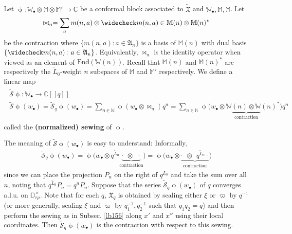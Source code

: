 \documentclass[12pt,a4paper,notitlepage]{article}
\theoremstyle{definition}
\theoremstyle{plain}
\newcommand{\fk}{\mathfrak}
\newcommand{\mc}{\mathcal}
\newcommand{\wtd}{\widetilde}
\newcommand{\wch}{\widecheck}
\newcommand{\End}{\mathrm{End}} %
\newcommand{\blt}{\bullet}
\newcommand{\Wbb}{\mathbb W}
\newcommand{\Mbb}{\mathbb M}
\newcommand{\Cbb}{\mathbb C}
\newcommand{\Nbb}{\mathbb N}
\newcommand{\Dbb}{\mathbb D}
\numberwithin{equation}{section}
\begin{document}
\subsection{}


Let $\upphi:\Wbb_\blt\otimes\Mbb\otimes\Mbb'\rightarrow\Cbb$ be a conformal block associated to $\wtd{\fk X}$ and $\Wbb_\blt,\Mbb,\Mbb$. Let 
\begin{align}
\bowtie_n=\sum_a m(n,a)\otimes \wch m(n,a)\in \Mbb(n)\otimes\Mbb(n)^*
\end{align}
be the contraction where $\{m(n,a):a\in\fk A_n\}$ is a basis of $\Mbb(n)$ with dual basis $\{\wch m(n,a):a\in\fk A_n\}$. Equivalently, $\bowtie_n$ is the identity operator when viewed as an element of $\End(\Wbb(n))$. Recall that $\Mbb(n)$ and $\Mbb(n)^*$ are respectively the $\wtd L_0$-weight $n$ subspaces of $\Mbb$ and $\Mbb'$ respectively. We define a linear map \index{S@$\wtd{\mc S}\upphi$, the normalized sewing}
\begin{gather}
\begin{gathered}
\wtd{\mc S}\upphi:\Wbb_\blt\rightarrow\Cbb[[q]]\\
\wtd{\mc S}\upphi(w_\blt)=\wtd{\mc S}_q\upphi(w_\blt)=\sum_{n\in\Nbb}\upphi(w_\blt\otimes \bowtie_n)q^n=\sum_{n\in\Nbb}\upphi\big(w_\blt\otimes \Wbb\underbrace{(n)\otimes\Wbb}_{\text{contraction}}(n)^*\big)q^n
\end{gathered}
\end{gather}
called the \textbf{(normalized) sewing} of $\upphi$. 

The meaning of $\wtd{\mc S}\upphi(w_\blt)$ is easy to understand: Informally, 
\begin{align}
\wtd{\mc S}_q\upphi(w_\blt)=\upphi\big(w_\blt\otimes q^{\wtd L_0}\underbrace{\cdot~~\otimes~~\cdot}_{\text{contraction}}\big)=\upphi\big(w_\blt\otimes \underbrace{\cdot~~\otimes~~q^{\wtd L_0}\cdot}_{\text{contraction}}\big)
\end{align}
since we can place the projection $P_n$ on the right of $q^{\wtd L_0}$ and take the sum over all $n$, noting that $q^{\wtd L_0}P_n=q^nP_n$. Suppose that the series $\wtd{\mc S}_q\upphi(w_\blt)$ of $q$ converges a.l.u. on $\Dbb_{r\rho}^\times$. Note that for each  $q$, $\fk X_q$ is obtained by scaling either $\xi$ or $\varpi$ by $q^{-1}$ (or more generally, scaling $\xi$ and $\varpi$ by $q_1^{-1},q_2^{-1}$ such that $q_1q_2=q$) and then perform the sewing as in Subsec. \ref{lb156} along $x'$ and $x''$ using their local coordinates. Then $\wtd{\mc S}_q\upphi(w_\blt)$ is the contraction with respect to this sewing.
\end{document}
